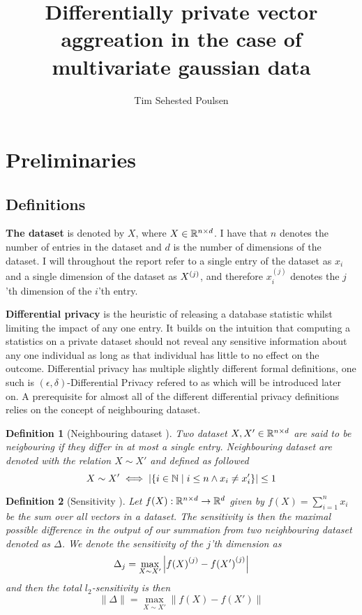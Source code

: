 \documentclass[a4paper,12pt]{article}
\title{Differentially private vector aggreation in the case of multivariate gaussian data}
\author{Tim Sehested Poulsen}
\newtheorem{definition}{Definition}[section]
\begin{document}
\maketitle

\section{Preliminaries}
\subsection{Definitions}

\textbf{The dataset} is denoted by $X$, where 
$X \in \mathbb{R}^{n \times d}$.
I have that $n$ denotes the number of entries in the dataset and 
$d$ is the number of dimensions of the dataset.
I will throughout the report refer to a single entry of 
the dataset as $x_i$ and a single dimension of the dataset as $X^{(j)}$, 
and therefore $x^{(j)}_i$
denotes the $j$'th dimension of the $i$'th entry.
\vspace*{0.3cm}

\textbf{Differential privacy} is the heuristic of 
releasing a database statistic whilst limiting the impact
of any one entry. It builds on the intuition that computing
a statistics on a private dataset should not reveal 
any sensitive information about any one individual 
as long as that individual has little to no effect on the outcome.
Differential privacy has multiple slightly different
formal definitions, 
one such is $(\epsilon, \delta)$-Differential Privacy
refered to as \edp which will be introduced later on.
A prerequisite for almost all of the different differential privacy
definitions relies on the concept of neighbouring dataset.
\vspace*{0.3cm}

\begin{definition}[Neighbouring dataset \cite{dwork2016}]
Two dataset $X, X' \in \mathbb{R}^{n \times d}$ are said to be 
neigbouring if they differ in at most a single entry.
Neighbouring dataset are denoted with the relation $X \sim X'$ and defined as followed
\[ X \sim X' \iff \left | \left \{ i \in \mathbb{N} \; \text{\textbar} \; i \le n \land x_i \ne x_i' \right\} \right| \le 1 \]
\end{definition}

\begin{definition}[Sensitivity \cite{Lebeda2022}]
Let $f(X): \mathbb{R}^{n \times d} \rightarrow \mathbb{R}^d$ given by 
$f(X) = \sum_{i = 1}^n x_i$ be the sum over all vectors in a dataset.
The sensitivity is then the maximal 
possible difference in the output of our summation  
from two neighbouring dataset denoted as $\Delta$.
We denote the sensitivity of the $j$'th dimension as
\[
\Delta_j = \max_{X \sim X'} \left |{f(X)}^{(j)} - {f(X')}^{(j)}\right| 
\]
and then the total $l_2$-sensitivity is then
\begin{equation}
    \label{eq:l2sens}
    \| \Delta \| = \max_{X \sim X'} \left\| {f(X)} - {f(X')} \right\|  
\end{equation}
    
\end{definition}
\end{document}
